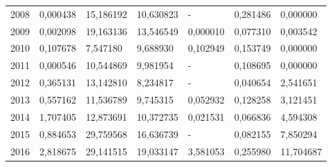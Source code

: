 \begin{table}
\begin{tabular}{p{1cm}p{2cm}p{2cm}p{2cm}p{2cm}p{2cm}p{2cm}}
 2008 &                               0,000438 &   15,186192 &                                   10,630823 &                                   - &                                           0,281486 &                            0,000000 \\
 2009 &                               0,002098 &   19,163136 &                                   13,546549 &                            0,000010 &                                           0,077310 &                            0,003542 \\
 2010 &                               0,107678 &    7,547180 &                                    9,688930 &                            0,102949 &                                           0,153749 &                            0,000000 \\
 2011 &                               0,000546 &   10,544869 &                                    9,981954 &                                   - &                                           0,108695 &                            0,000000 \\
 2012 &                               0,365131 &   13,142810 &                                    8,234817 &                                   - &                                           0,040654 &                            2,541651 \\
 2013 &                               0,557162 &   11,536789 &                                    9,745315 &                            0,052932 &                                           0,128258 &                            3,121451 \\
 2014 &                               1,707405 &   12,873691 &                                   10,372735 &                            0,021531 &                                           0,066836 &                            4,594308 \\
 2015 &                               0,884653 &   29,759568 &                                   16,636739 &                                   - &                                           0,082155 &                            7,850294 \\
 2016 &                               2,818675 &   29,141515 &                                   19,033147 &                            3,581053 &                                           0,255980 &                           11,704687 \\
\bottomrule
\end{tabular}
\end{table}
